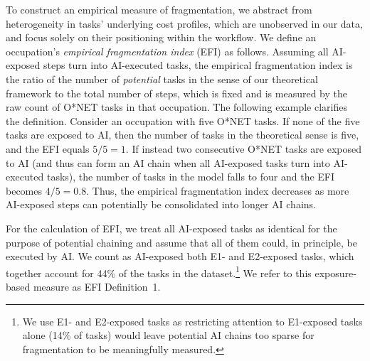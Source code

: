 To construct an empirical measure of fragmentation, we abstract from heterogeneity in tasks' underlying cost profiles, which are unobserved in our data, and focus solely on their positioning within the workflow.
We define an occupation's \emph{empirical fragmentation index} (EFI) as follows.
Assuming all AI-exposed steps turn into AI-executed tasks, the empirical fragmentation index is the ratio of the number of \emph{potential} tasks in the sense of our theoretical framework to the total number of steps, which is fixed and is measured by the raw count of O*NET tasks in that occupation.
The following example clarifies the definition.
Consider an occupation with five O*NET tasks.
If none of the five tasks are exposed to AI, then the number of tasks in the theoretical sense is five, and the EFI equals $5/5 = 1$.
If instead two consecutive O*NET tasks are exposed to AI (and thus can form an AI chain when all AI-exposed tasks turn into AI-executed tasks), the number of tasks in the model falls to four and the EFI becomes $4/5 = 0.8$.
Thus, the empirical fragmentation index decreases as more AI-exposed steps can potentially be consolidated into longer AI chains.

For the calculation of EFI, we treat all AI-exposed tasks as identical for the purpose of potential chaining and assume that all of them could, in principle, be executed by AI.
We count as AI-exposed both E1- and E2-exposed tasks, which together account for 44\% of the tasks in the dataset.\footnote{We use E1- and E2-exposed tasks as restricting attention to E1-exposed tasks alone (14\% of tasks) would leave potential AI chains too sparse for fragmentation to be meaningfully measured.}
We refer to this exposure-based measure as EFI Definition~1.

